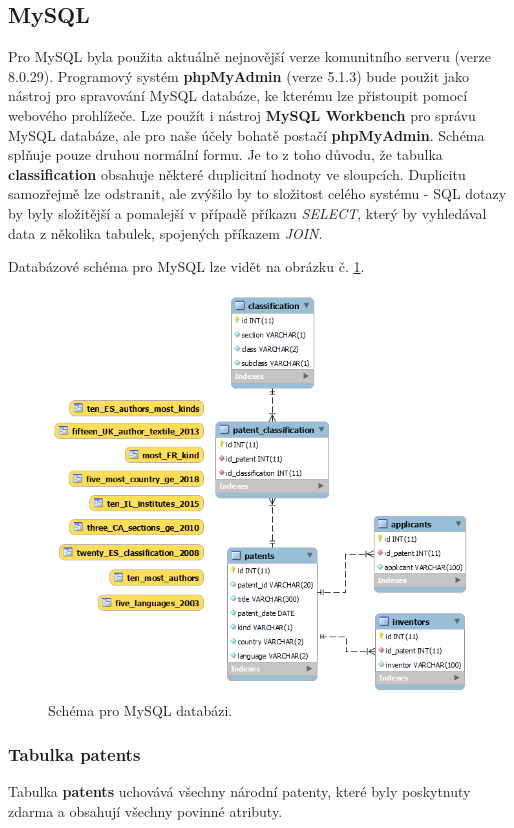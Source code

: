 \subsection{MySQL} \label{subsec:mysql_impl}
Pro MySQL byla použita aktuálně nejnovější verze komunitního serveru (verze 8.0.29). Programový systém \textbf{phpMyAdmin} (verze 5.1.3)  bude použit jako nástroj pro spravování MySQL databáze, ke kterému lze přistoupit pomocí webového prohlížeče. Lze použít i nástroj \textbf{MySQL Workbench} pro správu MySQL databáze, ale pro naše účely bohatě postačí \textbf{phpMyAdmin}.
\newline
\indent Schéma splňuje pouze druhou normální formu. Je to z toho důvodu, že tabulka \textbf{classification} obsahuje některé duplicitní hodnoty ve sloupcích. Duplicitu samozřejmě lze odstranit, ale zvýšilo by to složitost celého systému - \gls{SQL} dotazy by byly složitější a pomalejší v případě příkazu \textit{SELECT}, který by vyhledával data z několika tabulek, spojených příkazem \textit{JOIN}.
\newline

\noindent Databázové schéma pro MySQL lze vidět na obrázku č. \ref{fig:mysql_schema}.
\begin{figure}[H]
\centering
\includegraphics[width=12cm]{img/eer}
\caption{Schéma pro MySQL databázi.}
\label{fig:mysql_schema}
\end{figure}

\subsubsection{Tabulka patents}
Tabulka \textbf{patents} uchovává všechny národní patenty, které byly poskytnuty zdarma a obsahují všechny povinné atributy.

